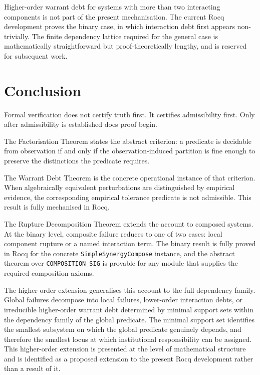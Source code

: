 \documentclass[12pt]{article}
\theoremstyle{plain}
\theoremstyle{definition}
\theoremstyle{remark}
\begin{document}
Higher-order warrant debt for systems with more than two interacting
components is not part of the present mechanisation.
The current Rocq development proves the binary case, in which
interaction debt first appears non-trivially.
The finite dependency lattice required for the general case is
mathematically straightforward but proof-theoretically lengthy, and is
reserved for subsequent work.

\section{Conclusion}
\label{sec:conclusion}

Formal verification does not certify truth first.
It certifies admissibility first.
Only after admissibility is established does proof begin.

The Factorisation Theorem states the abstract criterion: a predicate
is decidable from observation if and only if the observation-induced
partition is fine enough to preserve the distinctions the predicate
requires.

The Warrant Debt Theorem is the concrete operational instance of that
criterion.
When algebraically equivalent perturbations are distinguished by
empirical evidence, the corresponding empirical tolerance predicate is
not admissible.
This result is fully mechanised in Rocq.

The Rupture Decomposition Theorem extends the account to composed
systems.
At the binary level, composite failure reduces to one of two cases:
local component rupture or a named interaction term.
The binary result is fully proved in Rocq for the concrete
\texttt{SimpleSynergyCompose} instance, and the abstract theorem over
\texttt{COMPOSITION\_SIG} is provable for any module that supplies
the required composition axioms.

The higher-order extension generalises this account to the full
dependency family.
Global failures decompose into local failures, lower-order interaction
debts, or irreducible higher-order warrant debt determined by minimal
support sets within the dependency family of the global predicate.
The minimal support set identifies the smallest subsystem on which the
global predicate genuinely depends, and therefore the smallest locus
at which institutional responsibility can be assigned.
This higher-order extension is presented at the level of mathematical
structure and is identified as a proposed extension to the present
Rocq development rather than a result of it.
\end{document}

